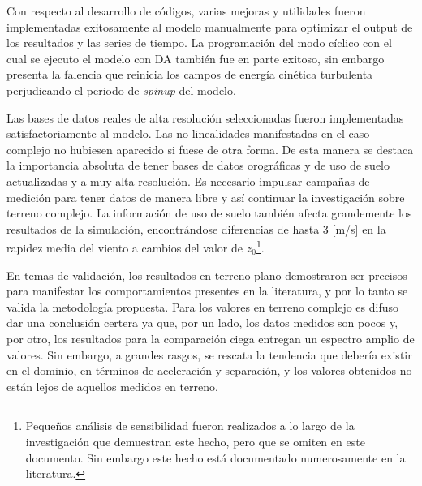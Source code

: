 \begin{itemize*}
	\item Con respecto al desarrollo de códigos, varias mejoras y utilidades fueron implementadas exitosamente al modelo manualmente para optimizar el output de los resultados y las series de tiempo. La programación del modo cíclico con el cual se ejecuto el modelo con DA también fue en parte exitoso, sin embargo presenta la falencia que reinicia los campos de energía cinética turbulenta perjudicando el periodo de \emph{spinup} del modelo.
	\item Las bases de datos reales de alta resolución seleccionadas fueron implementadas satisfactoriamente al modelo. Las no linealidades manifestadas en el caso complejo no hubiesen aparecido si fuese de otra forma. De esta manera se destaca la importancia absoluta de tener bases de datos orográficas y de uso de suelo actualizadas y a muy alta resolución. Es necesario impulsar campañas de medición para tener datos de manera libre y así continuar la investigación sobre terreno complejo. La información de uso de suelo también afecta grandemente los resultados de la simulación, encontrándose diferencias de hasta 3 [m/s] en la rapidez media del viento a cambios del valor de $z_0$\footnote{Pequeños análisis de sensibilidad fueron realizados a lo largo de la investigación que demuestran este hecho, pero que se omiten en este documento. Sin embargo este hecho está documentado numerosamente en la literatura.}.
	\item En temas de validación, los resultados en terreno plano demostraron ser precisos para manifestar los comportamientos presentes en la literatura, y por lo tanto se valida la metodología propuesta. Para los valores en terreno complejo es difuso dar una conclusión certera ya que, por un lado, los datos medidos son pocos y, por otro, los resultados para la comparación ciega entregan un espectro amplio de valores. Sin embargo, a grandes rasgos, se rescata la tendencia que debería existir en el dominio, en términos de aceleración y separación, y los valores obtenidos no están lejos de aquellos medidos en terreno.
\end{itemize*}
